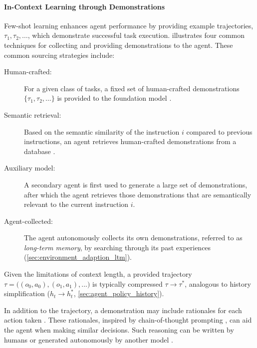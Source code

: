 \paragraph{In-Context Learning through Demonstrations}\label{sec:episodic_improvement_demostrations}

Few-shot learning enhances agent performance by providing example trajectories, ${\tau_1, \tau_2, \hdots}$, which demonstrate successful task execution.
 illustrates four common techniques for collecting and providing demonstrations to the agent. These common sourcing strategies include:

\begin{description}
    \item[Human-crafted:] 
        For a given class of tasks, a fixed set of human-crafted demonstrations $\{\tau_1, \tau_2, \hdots\}$ is provided to the foundation model .
    \item[Semantic retrieval:] 
        Based on the semantic similarity of the instruction $i$ compared to previous instructions, an agent retrieves human-crafted demonstrations from a database .
    \item[Auxiliary model:] 
        A secondary agent is first used to generate a large set of demonstrations, after which the agent retrieves those demonstrations that are semantically relevant to the current instruction $i$.
    \item[Agent-collected:] 
        The agent autonomously collects its own demonstrations, referred to as \textit{long-term memory}, by searching through its past experiences (\cref{sec:environment_adaption_ltm}).
\end{description}

Given the limitations of context length, a provided trajectory $\tau = \bigl((o_0,a_0), (o_1, a_1), ... \bigr)$ is typically compressed $\tau \rightarrow \tau^*$,  analogous to history simplification ($h_t \rightarrow h_t^*$, \cref{sec:agent_policy_history}).

In addition to the trajectory, a demonstration may include rationales for each action taken . These rationales, inspired by chain-of-thought prompting \citep{liu_chain_2023}, can aid the agent when making similar decisions. Such reasoning can be written by humans  or generated autonomously by another model .


